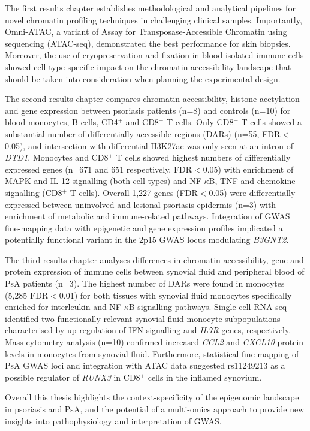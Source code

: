 {\begin{minipage}[t]{1.1\linewidth}
\noindent The first results chapter establishes methodological and analytical pipelines for novel chromatin profiling techniques in challenging clinical samples. Importantly, Omni-ATAC, a variant of Assay for Transposase-Accessible Chromatin using sequencing (ATAC-seq), demonstrated the best performance for skin biopsies. Moreover, the use of cryopreservation and fixation in blood-isolated immune cells showed cell-type specific impact on the chromatin accessibility landscape that should be taken into consideration when planning the experimental design.

\noindent The second results chapter compares chromatin accessibility, histone acetylation and gene expression between psoriasis patients (n=8) and controls (n=10) for blood monocytes, B cells, CD4$^+$ and CD8$^+$ T cells. Only CD8$^+$ T cells showed a substantial number of differentially accessible regions (DARs) (n=55, FDR$<$ 0.05), and intersection with differential H3K27ac was only seen at an intron of \textit{DTD1}. Monocytes and CD8$^+$ T cells showed highest numbers of differentially expressed genes (n=671 and 651 respectively, FDR$<$0.05) with enrichment of MAPK and IL-12 signalling (both cell types) and NF-$\kappa$B, TNF and chemokine signalling (CD8$^+$ T cells). Overall 1,227 genes (FDR$<$0.05) were differentially expressed between uninvolved and lesional psoriasis epidermis (n=3) with enrichment of metabolic and immune-related pathways. Integration of GWAS fine-mapping data with epigenetic and gene expression profiles implicated a potentially functional variant in the 2p15 GWAS locus modulating \textit{B3GNT2}.

\noindent The third results chapter analyses differences in chromatin accessibility, gene and protein expression of immune cells between synovial fluid and peripheral blood of PsA patients (n=3). The highest number of DARs were found in monocytes (5,285 FDR$<$0.01) for both tissues with synovial fluid monocytes specifically enriched for interleukin and NF-$\kappa$B signalling pathways. Single-cell RNA-seq identified two functionally relevant synovial fluid monocyte subpopulations characterised by up-regulation of IFN signalling and \textit{IL7R} genes, respectively. Mass-cytometry analysis (n=10) confirmed increased \textit{CCL2} and \textit{CXCL10} protein levels in monocytes from synovial fluid. Furthermore, statistical fine-mapping of PsA GWAS loci and integration with  ATAC data suggested rs11249213 as a possible regulator of \textit{RUNX3} in CD8$^+$ cells in the inflamed synovium.

\noindent Overall this thesis highlights the context-specificity of the epigenomic landscape in psoriasis and PsA, and the potential of a multi-omics approach to provide new insights into pathophysiology and interpretation of GWAS.\\

\end{minipage}}
%


